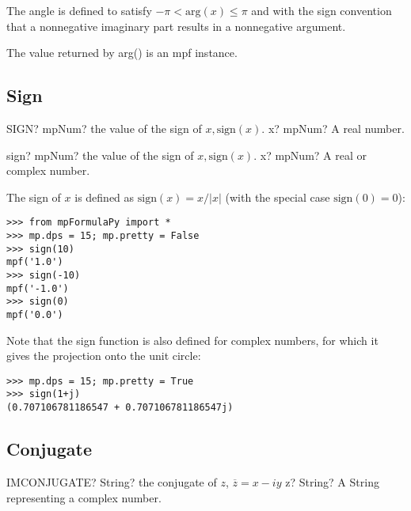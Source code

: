 The angle is defined to satisfy $-\pi < \text{arg}(x) \leq \pi$ and with the sign convention that a nonnegative imaginary part results in a nonnegative argument.

\vpara
The value returned by arg() is an mpf instance.





\subsection{Sign}



\begin{mpFunctionsExtract}
	\mpWorksheetFunctionOneNotImplemented
	{SIGN? mpNum? the value of the sign of $x, \text{sign}(x)$.}
	{x? mpNum? A real number.}
\end{mpFunctionsExtract}

\vspace{0.6cm}

\begin{mpFunctionsExtract}
	\mpFunctionOne
	{sign? mpNum? the value of the sign of $x, \text{sign}(x)$.}
	{x? mpNum? A real or complex number.}
\end{mpFunctionsExtract}



The sign of $x$ is defined as $\text{sign}(x)=x/|x|$ (with the special case $\text{sign}(0)=0$):

\begin{lstlisting}
>>> from mpFormulaPy import *
>>> mp.dps = 15; mp.pretty = False
>>> sign(10)
mpf('1.0')
>>> sign(-10)
mpf('-1.0')
>>> sign(0)
mpf('0.0')
\end{lstlisting}


Note that the sign function is also defined for complex numbers, for which it gives the projection onto the unit circle:

\begin{lstlisting}
>>> mp.dps = 15; mp.pretty = True
>>> sign(1+j)
(0.707106781186547 + 0.707106781186547j)
\end{lstlisting}


\subsection{Conjugate}

\begin{mpFunctionsExtract}
	\mpWorksheetFunctionOneNotImplemented
	{IMCONJUGATE? String? the conjugate of $z$, $\overline{z}=x-iy$}
	{z? String? A String representing a complex number.}
\end{mpFunctionsExtract}

